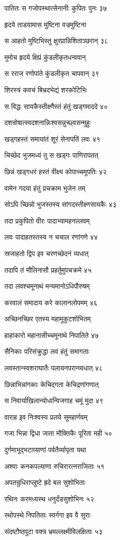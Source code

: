 पातितः स गजोपस्थात्सेनानीः कुपितः पुनः ३७

हृदये ताडयामास मुष्टिना वज्रमुष्टिना

स आहतो मुष्टिभिस्तु क्षुरप्रान्निशिताञ्छरान् ३८

मुमोच हृदये क्षिप्रं कुंडलीकृतधन्ववान्

स रराज रणोपांते कुंडलीकृत चापवान् ३९

शिरस्त्रं कवचं बिभ्रदभेद्यं शरकोटिभिः

स विद्धः सायकैस्तीक्ष्णैस्तं हंतुं खड्गमाददे ४०

दशन्रोषात्स्वदशनान्निःश्वसन्नुच्छ्वसन्मुहुः

खड्गहस्तं समायांतं शूरं सेनापतिं लवः ४१

चिच्छेद भुजमध्यं तु स खड्गः पाणिरापतत्

छिन्नं खड्गधरं हस्तं वीक्ष्य कोपाच्चमूपतिः ४२

वामेन गदया हंतुं प्रचक्राम भुजेन तम्

सोऽपि च्छिन्नो भुजस्तस्य सांगदस्तीक्ष्णसायकैः ४३

तदा प्रकुपितो वीरः पादाभ्यामहनल्लवम्

लवः पादाहतस्तस्य न चचाल रणांगणे ४४

स्रजाहतो द्विप इव चरणच्छेदनं व्यधात्

तदापि तं मौलिनासौ प्रहर्तुमुपचक्रमे ४५

तदा लवश्चमूनाथं मन्यमानोऽधिपौरुषम्

करवालं समादाय करे कालानलोपमम् ४६

अच्छिनच्छिर एतस्य महामुकुटशोभितम्

हाहाकारो महानासीच्चमूनाथे निपातिते ४७

सैनिकाः परिसंक्रुद्धा लवं हंतुं समागताः

लवस्तान्स्वशराघातैः पलायनपरान्व्यधात् ४८

छिन्नाभिन्नांगकाः केचिद्गता केचिद्रणांगणात्

स निवार्याखिलान्योधान्विजगाह चमूं मुदा ४९

वाराह इव निःश्वस्य प्रलये सुमहार्णवम्

गजा भिन्ना द्विधा जाता मौक्तिकैः पूरिता मही ५०

दुर्गमाभूद्भटाग्र्याणां पर्वतैर्व्यापृता यथा

अश्वाः कनकपल्याणा रुचिरारत्नराजिताः ५१

अपतन्रुधिराप्लुष्टे ह्रदे बल सुशोभिताः

रथिनः करमध्यस्थ धनुर्दंडसुशोभिनः ५२

रथोपस्थे निपतिताः स्वर्गगा इव वै सुराः

संदष्टौष्ठपुटा वक्त्र भ्रमल्लक्ष्मीविलक्षिताः ५३

